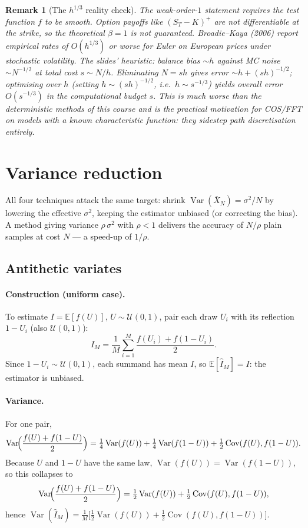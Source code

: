 \documentclass[11pt]{article}
\newcommand{\E}{\mathbb{E}}
\newcommand{\Var}{\operatorname{Var}}
\newcommand{\Cov}{\operatorname{Cov}}
\newtheorem{remark}{Remark}
\begin{document}
\begin{remark}[The $h^{1/3}$ reality check]
The weak-order-$1$ statement requires the test function $f$ to be smooth. Option
payoffs like $(S_T-K)^+$ are \emph{not} differentiable at the strike, so the theoretical
$\beta=1$ is not guaranteed. Broadie--Kaya (2006) report empirical rates of
$O(h^{1/3})$ or worse for Euler on European prices under stochastic volatility. The
slides' heuristic: balance bias $\sim h$ against MC noise $\sim N^{-1/2}$ at total cost
$s\sim N/h$. Eliminating $N=sh$ gives error $\sim h+ (sh)^{-1/2}$; optimising over $h$
(setting $h\sim(sh)^{-1/2}$, i.e.\ $h\sim s^{-1/3}$) yields overall error $O(s^{-1/3})$
in the computational budget $s$. This is much worse than the deterministic methods of
this course and is the practical motivation for COS/FFT on models with a known
characteristic function: they sidestep path discretisation entirely.
\end{remark}

\section{Variance reduction}

All four techniques attack the same target: shrink $\Var(\bar X_N)=\sigma^2/N$ by
lowering the effective $\sigma^2$, keeping the estimator unbiased (or correcting the
bias). A method giving variance $\rho\,\sigma^2$ with $\rho<1$ delivers the accuracy of
$N/\rho$ plain samples at cost $N$ --- a speed-up of $1/\rho$.

\subsection{Antithetic variates}

\paragraph{Construction (uniform case).} To estimate $I=\E[f(U)]$, $U\sim\mathcal
U(0,1)$, pair each draw $U_i$ with its reflection $1-U_i$ (also $\mathcal U(0,1)$):
\[
\widehat I_M=\frac1M\sum_{i=1}^M\frac{f(U_i)+f(1-U_i)}{2}.
\]
Since $1-U_i\sim\mathcal U(0,1)$, each summand has mean $I$, so $\E[\widehat I_M]=I$:
the estimator is unbiased.

\paragraph{Variance.} For one pair,
\[
\Var\!\Bigl(\frac{f(U)+f(1-U)}2\Bigr)
=\tfrac14\Var(f(U))+\tfrac14\Var(f(1-U))+\tfrac12\Cov(f(U),f(1-U)).
\]
Because $U$ and $1-U$ have the same law, $\Var(f(U))=\Var(f(1-U))$, so this collapses to
\[
\Var\!\Bigl(\frac{f(U)+f(1-U)}2\Bigr)
=\tfrac12\Var(f(U))+\tfrac12\Cov(f(U),f(1-U)),
\]
hence $\Var(\widehat I_M)=\frac1M\bigl[\tfrac12\Var(f(U))+\tfrac12\Cov(f(U),f(1-U))\bigr]$.
\end{document}
